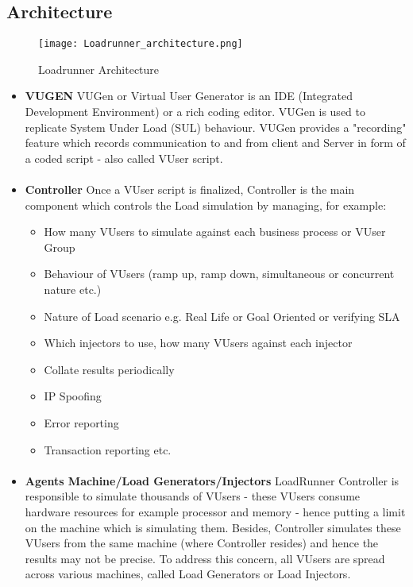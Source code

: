 \documentclass[../thesis.tex]{subfiles}
\begin{document}
\subsection*{Architecture}
\begin{figure}[ht!]
  \centering
  \texttt{[image: Loadrunner\_architecture.png]}
  \caption{Loadrunner Architecture \label{overflow}}
\end{figure}
\begin{itemize}
  \item \textbf{VUGEN} VUGen or Virtual User Generator is an IDE (Integrated Development Environment) or a rich coding editor. VUGen is used to replicate System Under Load (SUL) behaviour. VUGen provides a "recording" feature which records communication to and from client and Server in form of a coded script - also called VUser script.
  \paragraph{}
  \item \textbf{Controller} Once a VUser script is finalized, Controller is the main component which controls the Load simulation by managing, for example:
    \begin{itemize}
      \item How many VUsers to simulate against each business process or VUser Group
      \item Behaviour of VUsers (ramp up, ramp down, simultaneous or concurrent nature etc.)
      \item Nature of Load scenario e.g. Real Life or Goal Oriented or verifying SLA
      \item Which injectors to use, how many VUsers against each injector
      \item Collate results periodically
      \item IP Spoofing
      \item Error reporting
      \item Transaction reporting etc. 
    \end{itemize}
    \paragraph{}
  \item \textbf{Agents Machine/Load Generators/Injectors} LoadRunner Controller is responsible to simulate thousands of VUsers - these VUsers consume hardware resources for example processor and memory - hence putting a limit on the machine which is simulating them. Besides, Controller simulates these VUsers from the same machine (where Controller resides) and hence the results may not be precise. To address this concern, all VUsers are spread across various machines, called Load Generators or Load Injectors.

\end{itemize}
\end{document}
